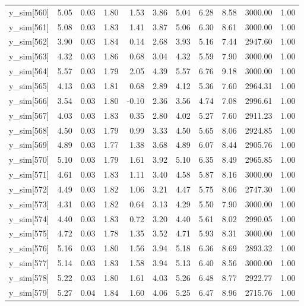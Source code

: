 \begin{table}[ht]
\begin{tabular}{rrrrrrrrrrr}
  y\_sim[560] & 5.05 & 0.03 & 1.80 & 1.53 & 3.86 & 5.04 & 6.28 & 8.58 & 3000.00 & 1.00 \\ 
  y\_sim[561] & 5.08 & 0.03 & 1.83 & 1.41 & 3.87 & 5.06 & 6.30 & 8.61 & 3000.00 & 1.00 \\ 
  y\_sim[562] & 3.90 & 0.03 & 1.84 & 0.14 & 2.68 & 3.93 & 5.16 & 7.44 & 2947.60 & 1.00 \\ 
  y\_sim[563] & 4.32 & 0.03 & 1.86 & 0.68 & 3.04 & 4.32 & 5.59 & 7.90 & 3000.00 & 1.00 \\ 
  y\_sim[564] & 5.57 & 0.03 & 1.79 & 2.05 & 4.39 & 5.57 & 6.76 & 9.18 & 3000.00 & 1.00 \\ 
  y\_sim[565] & 4.13 & 0.03 & 1.81 & 0.68 & 2.89 & 4.12 & 5.36 & 7.60 & 2964.31 & 1.00 \\ 
  y\_sim[566] & 3.54 & 0.03 & 1.80 & -0.10 & 2.36 & 3.56 & 4.74 & 7.08 & 2996.61 & 1.00 \\ 
  y\_sim[567] & 4.03 & 0.03 & 1.83 & 0.35 & 2.80 & 4.02 & 5.27 & 7.60 & 2911.23 & 1.00 \\ 
  y\_sim[568] & 4.50 & 0.03 & 1.79 & 0.99 & 3.33 & 4.50 & 5.65 & 8.06 & 2924.85 & 1.00 \\ 
  y\_sim[569] & 4.89 & 0.03 & 1.77 & 1.38 & 3.68 & 4.89 & 6.07 & 8.44 & 2905.76 & 1.00 \\ 
  y\_sim[570] & 5.10 & 0.03 & 1.79 & 1.61 & 3.92 & 5.10 & 6.35 & 8.49 & 2965.85 & 1.00 \\ 
  y\_sim[571] & 4.61 & 0.03 & 1.83 & 1.11 & 3.40 & 4.58 & 5.87 & 8.16 & 3000.00 & 1.00 \\ 
  y\_sim[572] & 4.49 & 0.03 & 1.82 & 1.06 & 3.21 & 4.47 & 5.75 & 8.06 & 2747.30 & 1.00 \\ 
  y\_sim[573] & 4.31 & 0.03 & 1.82 & 0.64 & 3.13 & 4.29 & 5.50 & 7.90 & 3000.00 & 1.00 \\ 
  y\_sim[574] & 4.40 & 0.03 & 1.83 & 0.72 & 3.20 & 4.40 & 5.61 & 8.02 & 2990.05 & 1.00 \\ 
  y\_sim[575] & 4.72 & 0.03 & 1.78 & 1.35 & 3.52 & 4.71 & 5.93 & 8.31 & 3000.00 & 1.00 \\ 
  y\_sim[576] & 5.16 & 0.03 & 1.80 & 1.56 & 3.94 & 5.18 & 6.36 & 8.69 & 2893.32 & 1.00 \\ 
  y\_sim[577] & 5.14 & 0.03 & 1.83 & 1.58 & 3.94 & 5.13 & 6.40 & 8.56 & 3000.00 & 1.00 \\ 
  y\_sim[578] & 5.22 & 0.03 & 1.80 & 1.61 & 4.03 & 5.26 & 6.48 & 8.77 & 2922.77 & 1.00 \\ 
  y\_sim[579] & 5.27 & 0.04 & 1.84 & 1.60 & 4.06 & 5.25 & 6.47 & 8.96 & 2715.76 & 1.00 \\ 

\end{tabular}
\end{table}
